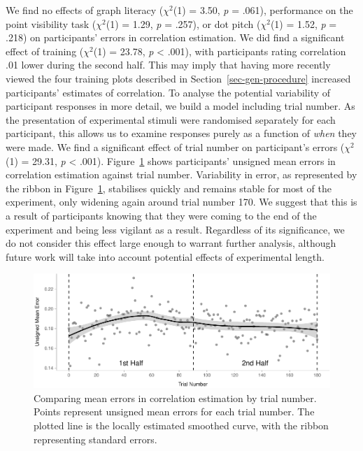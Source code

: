\documentclass[manuscript, review, anonymous, screen]{acmart}
\begin{document}
We find no effects of graph literacy (\(\chi^2\)(1) = 3.50, \emph{p} =
.061), performance on the point visibility task (\(\chi^2\)(1) = 1.29,
\emph{p} = .257), or dot pitch (\(\chi^2\)(1) = 1.52, \emph{p} = .218)
on participants' errors in correlation estimation. We did find a
significant effect of training (\(\chi^2\)(1) = 23.78, \emph{p}
\textless{} .001), with participants rating correlation .01 lower during
the second half. This may imply that having more recently viewed the
four training plots described in Section~\ref{sec-gen-procedure}
increased participants' estimates of correlation. To analyse the
potential variability of participant responses in more detail, we build
a model including trial number. As the presentation of experimental
stimuli were randomised separately for each participant, this allows us
to examine responses purely as a function of \emph{when} they were made.
We find a significant effect of trial number on participant's errors
(\(\chi^2\)(1) = 29.31, \emph{p} \textless{} .001).
Figure~\ref{fig-time-plot} shows participants' unsigned mean errors in
correlation estimation against trial number. Variability in error, as
represented by the ribbon in Figure~\ref{fig-time-plot}, stabilises
quickly and remains stable for most of the experiment, only widening
again around trial number 170. We suggest that this is a result of
participants knowing that they were coming to the end of the experiment
and being less vigilant as a result. Regardless of its significance, we
do not consider this effect large enough to warrant further analysis,
although future work will take into account potential effects of
experimental length.

\begin{figure}

{\centering \includegraphics[width=1\textwidth,height=\textheight]{size_and_opacity_files/figure-pdf/fig-time-plot-1.pdf}

}

\caption{\label{fig-time-plot}Comparing mean errors in correlation
estimation by trial number. Points represent unsigned mean errors for
each trial number. The plotted line is the locally estimated smoothed
curve, with the ribbon representing standard errors.}

\end{figure}
\end{document}
